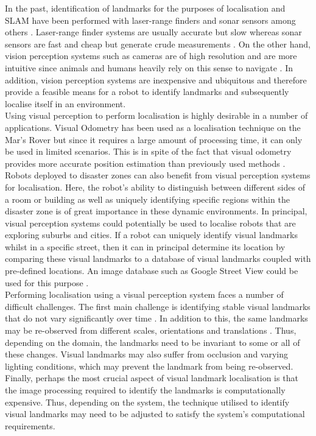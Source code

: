 \documentclass{report}
\begin{document}
In the past, identification of landmarks for the purposes of localisation and SLAM have been performed with laser-range finders and sonar sensors among others \cite{Davison2007}. Laser-range finder systems are usually accurate but slow whereas sonar sensors are fast and cheap but generate crude measurements \cite{Se2002}. On the other hand, vision perception systems such as cameras are of high resolution and are more intuitive since animals and humans heavily rely on this sense to navigate \cite{Davison2007}. In addition, vision perception systems are inexpensive and ubiquitous and therefore provide a feasible means for a robot to identify landmarks and subsequently localise itself in an environment.\\

Using visual perception to perform localisation is highly desirable in a number of applications. Visual Odometry has been used as a localisation technique on the Mar's Rover \cite{Di2008} but since it requires a large amount of processing time, it can only be used in limited scenarios. This is in spite of the fact that visual odometry provides more accurate position estimation than previously used methods \cite{Powell2006}. Robots deployed to disaster zones can also benefit from visual perception systems for localisation. Here, the robot's ability to distinguish between different sides of a room or building as well as uniquely identifying specific regions within the disaster zone is of great importance in these dynamic environments. In principal, visual perception systems could potentially be used to localise robots that are exploring suburbs and cities. If a robot can uniquely identify visual landmarks whilst in a specific street, then it can in principal determine its location by comparing these visual landmarks to a database of visual landmarks coupled with pre-defined locations. An image database such as Google Street View could be used for this purpose \cite{StreetView}.\\

Performing localisation using a visual perception system faces a number of difficult challenges. The first main challenge is identifying stable visual landmarks that do not vary significantly over time \cite{Davison2007, Se2002}. In addition to this, the same landmarks may be re-observed from different scales, orientations and translations \cite{Szeliski2010}. Thus, depending on the domain, the landmarks need to be invariant to some or all of these changes. Visual landmarks may also suffer from occlusion and varying lighting conditions, which may prevent the landmark from being re-observed. Finally, perhaps the most crucial aspect of visual landmark localisation is that the image processing required to identify the landmarks is computationally expensive. Thus, depending on the system, the technique utilised to identify visual landmarks may need to be adjusted to satisfy the system's computational requirements. \\
\end{document}
